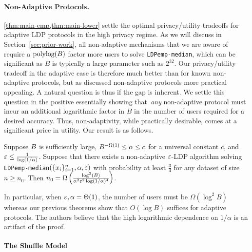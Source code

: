  \paragraph{Non-Adaptive Protocols.}
%
\cref{thm:main-emp,thm:main-lower} settle the optimal privacy/utility tradeoffs for adaptive LDP protocols in the high privacy regime. 
As we will discuss in Section~\ref{sec:prior-work}, all non-adaptive mechanisms that we are aware of require a $\text{polylog}(B)$ factor more users to solve \texttt{LDPemp-median}, which can be significant as $B$ is typically a large parameter such as $2^{32}$. 
Our privacy/utility tradeoff in the adaptive case is therefore much better than for known non-adaptive protocols, but as discussed non-adaptive protocols more practical appealing. A natural question is thus if the gap is inherent. We settle this question in the positive essentially showing that~\emph{any} non-adaptive protocol must incur an additional logarithmic factor in $B$ in the number of users required for a desired accuracy. Thus, non-adaptivity, while practically desirable, comes at a significant price in utility. Our result is as follows.
\begin{theorem}\label{thm:intro-lower-non-interactive}
    Suppose $B$ is sufficiently large, $B^{-\Omega(1)} \leq \alpha \leq c $ for a universal constant $c$, and $\varepsilon \leq \frac{1}{\log(1/\alpha)}$.
    Suppose that there exists a non-adaptive $\varepsilon$-LDP algorithm solving \texttt{LDPemp-median}$(\{x_i\}_{i=1}^n, \alpha, \varepsilon)$ with probability at least $\frac{3}{4}$ for any dataset of size $n \geq n_0$. 
    Then $n_0 = \Omega\left(\frac{\log^2(B)}{\alpha^2\varepsilon^2 \log(1/\alpha)^4}\right)$. 
\end{theorem}
In particular, when $\varepsilon,\alpha=\Theta(1)$, the number of users must be $\Omega(\log^2 B)$ whereas our previous theorems show that $O(\log B)$ suffices for adaptive protocols. The authors believe that the high logarithmic dependence on $1/\alpha$ is an artifact of the proof.




%



%
%
%
%
%

%
%
%
%

%
%

%




\paragraph{The Shuffle Model}

